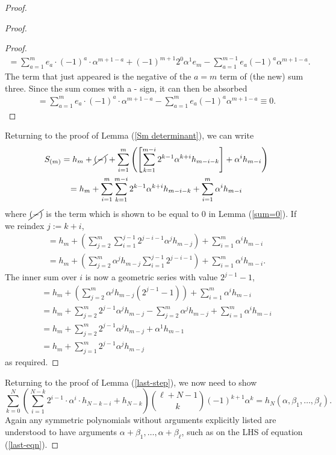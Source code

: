 \documentclass[11pt]{article}
\theoremstyle{plain}
\theoremstyle{definition}
\theoremstyle{definition}
\newcounter{equation}
\begin{document}
\begin{proof}
\begin{proof}
\begin{proof}
\begin{gather*}
= \sum_{a=1}^me_a\cdot(-1)^a\cdot \alpha^{m+1-a}+(-1)^{m+1}2^0\alpha^{1}e_m -\sum_{a=1}^{m-1}e_{a}(-1)^a \alpha^{m+1-a}.
\end{gather*}
The term that just appeared is the negative of the $a=m$ term of (the new) sum three. Since the sum comes with a - sign, it can then be absorbed 
\begin{gather*}
= \sum_{a=1}^me_{a}\cdot(-1)^a\cdot \alpha^{m+1-a} -\sum_{a=1}^{m}e_{a}(-1)^a \alpha^{m+1-a} \equiv 0.
\end{gather*}
\end{proof}
Returning to the proof of Lemma (\ref{Sm determinant}), we can write 
\begin{gather*}
S_{(m)}=h_m +\cancel{(-)} + \sum_{i=1}^m\left(\left[\sum_{k=1}^{m-i}2^{k-1}\alpha^{k+i}h_{m-i-k}\right]+\alpha^ih_{m-i}\right)\\
=h_m +\sum_{i=1}^m\sum_{k=1}^{m-i}2^{k-1}\alpha^{k+i}h_{m-i-k}+\sum_{i=1}^m\alpha^ih_{m-i}
\end{gather*}
where $\cancel{(-)}$ is the term which is shown to be equal to 0 in Lemma (\ref{sum=0}). If we reindex $j:=k+i$, 
\begin{gather*}
=h_m + \left(\sum_{j=2}^m\sum_{i=1}^{j-1}2^{j-i-1}\alpha^jh_{m-j}\right)+\sum_{i=1}^m\alpha^ih_{m-i}\\
=h_m + \left(\sum_{j=2}^m\alpha^jh_{m-j}\sum_{i=1}^{j-1}2^{j-i-1}\right)+\sum_{i=1}^m\alpha^ih_{m-i}.
\end{gather*}
The inner sum over $i$ is now a geometric series with value $2^{j-1}-1$,
\begin{gather*}
=h_m + \left(\sum_{j=2}^m\alpha^jh_{m-j}(2^{j-1}-1)\right)+\sum_{i=1}^m\alpha^ih_{m-i}\\
=h_m + \sum_{j=2}^m2^{j-1}\alpha^jh_{m-j}-\sum_{j=2}^m\alpha^jh_{m-j}+\sum_{i=1}^m\alpha^ih_{m-i}\\
=h_m + \sum_{j=2}^m2^{j-1}\alpha^jh_{m-j}+\alpha^1h_{m-1}\\
=h_m + \sum_{j=1}^m2^{j-1}\alpha^jh_{m-j}
\end{gather*}
as required.
\end{proof}
Returning to the proof of Lemma (\ref{last-step}), we now need to show 
\begin{equation}\label{last-eqn}
\sum_{k=0}^N\left(\sum_{i=1}^{N-k}2^{i-1}\cdot \alpha^i\cdot h_{N-k-i}+h_{N-k}\right){\ell+N-1\choose k}(-1)^{k+1}\alpha^k = h_N(\alpha,\beta_1,\dots,\beta_\ell).
\end{equation}
Again any symmetric polynomials without arguments explicitly listed are understood to have arguments $\alpha+\beta_1,\dots,\alpha+\beta_\ell$, such as on the LHS of equation (\ref{last-eqn}). 

\end{proof}
\end{document}
